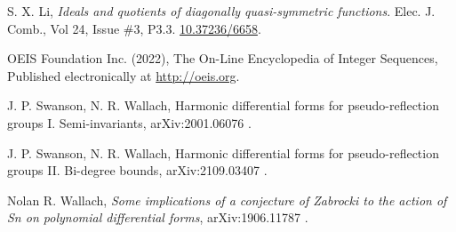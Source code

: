 \documentclass[11pt]{amsart}
\theoremstyle{definition}
\numberwithin{equation}{section}
\begin{document}
\begin{thebibliography}{999}
 S. X. Li,
\textit{Ideals and quotients of diagonally quasi-symmetric functions}.
Elec. J. Comb., Vol 24, Issue \#3, P3.3.
\href{https://doi.org/10.37236/6658}{10.37236/6658}.

 OEIS Foundation Inc. (2022),
The On-Line Encyclopedia of Integer Sequences, Published electronically at
\href{http://oeis.org}{http://oeis.org}.

 J. P. Swanson, N. R. Wallach,
Harmonic differential forms for pseudo-reflection groups I. Semi-invariants,
arXiv:2001.06076 .

 J. P. Swanson, N. R. Wallach,
Harmonic differential forms for pseudo-reflection groups II. Bi-degree bounds,
arXiv:2109.03407 .


 Nolan R. Wallach,
\textit{Some implications of a conjecture of Zabrocki
to the action of Sn on polynomial differential
forms}, arXiv:1906.11787 .

\end{thebibliography}
\end{document}

